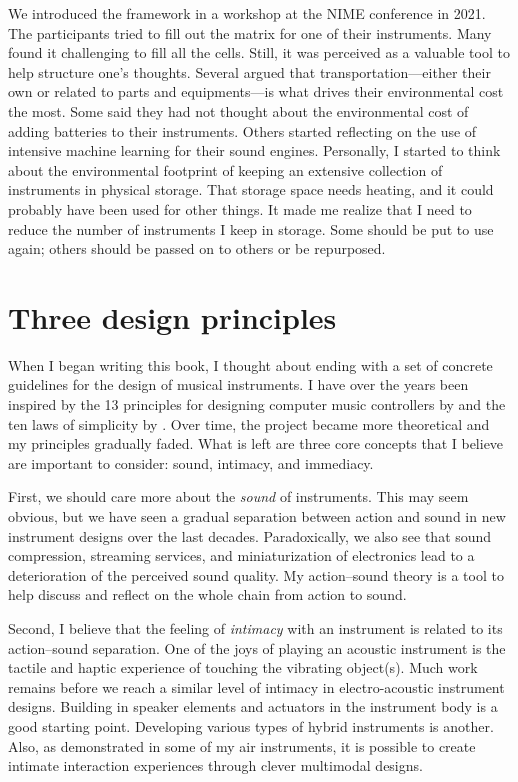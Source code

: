 We introduced the framework in a workshop at the NIME conference in 2021. The participants tried to fill out the matrix for one of their instruments. Many found it challenging to fill all the cells. Still, it was perceived as a valuable tool to help structure one's thoughts. Several argued that transportation---either their own or related to parts and equipments---is what drives their environmental cost the most. Some said they had not thought about the environmental cost of adding batteries to their instruments. Others started reflecting on the use of intensive machine learning for their sound engines. Personally, I started to think about the environmental footprint of keeping an extensive collection of instruments in physical storage. That storage space needs heating, and it could probably have been used for other things. It made me realize that I need to reduce the number of instruments I keep in storage. Some should be put to use again; others should be passed on to others or be repurposed.


\section{Three design principles}

When I began writing this book, I thought about ending with a set of concrete guidelines for the design of musical instruments. I have over the years been inspired by the 13 principles for designing computer music controllers by \citet{cook_principles_2001} and the ten laws of simplicity by \citep{maeda_laws_2006}. Over time, the project became more theoretical and my principles gradually faded. What is left are three core concepts that I believe are important to consider: sound, intimacy, and immediacy.

First, we should care more about the \emph{sound} of instruments. This may seem obvious, but we have seen a gradual separation between action and sound in new instrument designs over the last decades. Paradoxically, we also see that sound compression, streaming services, and miniaturization of electronics lead to a deterioration of the perceived sound quality. My action--sound theory is a tool to help discuss and reflect on the whole chain from action to sound.

Second, I believe that the feeling of \emph{intimacy} with an instrument is related to its action--sound separation. One of the joys of playing an acoustic instrument is the tactile and haptic experience of touching the vibrating object(s). Much work remains before we reach a similar level of intimacy in electro-acoustic instrument designs. Building in speaker elements and actuators in the instrument body is a good starting point. Developing various types of hybrid instruments is another. Also, as demonstrated in some of my air instruments, it is possible to create intimate interaction experiences through clever multimodal designs.

